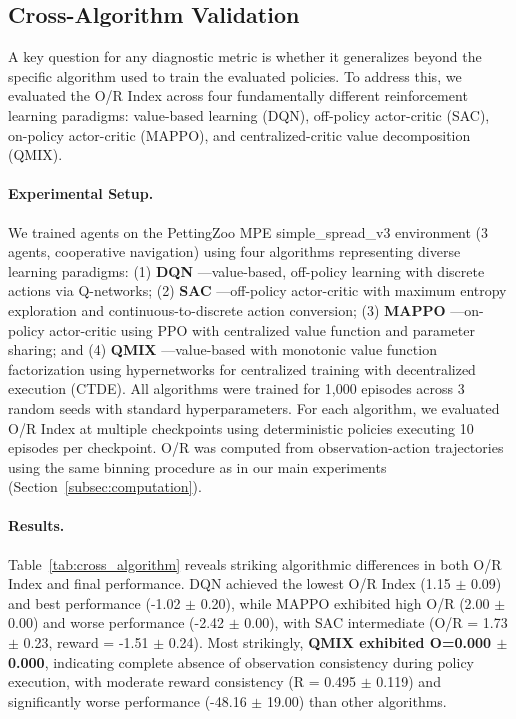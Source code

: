 
\subsection{Cross-Algorithm Validation}
\label{sec:cross_algorithm}

A key question for any diagnostic metric is whether it generalizes beyond the specific algorithm used to train the evaluated policies. To address this, we evaluated the O/R Index across four fundamentally different reinforcement learning paradigms: value-based learning (DQN), off-policy actor-critic (SAC), on-policy actor-critic (MAPPO), and centralized-critic value decomposition (QMIX).

\paragraph{Experimental Setup.}
We trained agents on the PettingZoo MPE simple\_spread\_v3 environment (3 agents, cooperative navigation) using four algorithms representing diverse learning paradigms: (1) \textbf{DQN} \citep{mnih2015human}—value-based, off-policy learning with discrete actions via Q-networks; (2) \textbf{SAC} \citep{haarnoja2018soft}—off-policy actor-critic with maximum entropy exploration and continuous-to-discrete action conversion; (3) \textbf{MAPPO} \citep{yu2022surprising}—on-policy actor-critic using PPO with centralized value function and parameter sharing; and (4) \textbf{QMIX} \citep{rashid2018qmix}—value-based with monotonic value function factorization using hypernetworks for centralized training with decentralized execution (CTDE). All algorithms were trained for 1,000 episodes across 3 random seeds with standard hyperparameters. For each algorithm, we evaluated O/R Index at multiple checkpoints using deterministic policies executing 10 episodes per checkpoint. O/R was computed from observation-action trajectories using the same binning procedure as in our main experiments (Section~\ref{subsec:computation}).

\paragraph{Results.}
Table~\ref{tab:cross_algorithm} reveals striking algorithmic differences in both O/R Index and final performance. DQN achieved the lowest O/R Index (1.15 $\pm$ 0.09) and best performance (-1.02 $\pm$ 0.20), while MAPPO exhibited high O/R (2.00 $\pm$ 0.00) and worse performance (-2.42 $\pm$ 0.00), with SAC intermediate (O/R = 1.73 $\pm$ 0.23, reward = -1.51 $\pm$ 0.24). Most strikingly, \textbf{QMIX exhibited O=0.000 $\pm$ 0.000}, indicating complete absence of observation consistency during policy execution, with moderate reward consistency (R = 0.495 $\pm$ 0.119) and significantly worse performance (-48.16 $\pm$ 19.00) than other algorithms.

